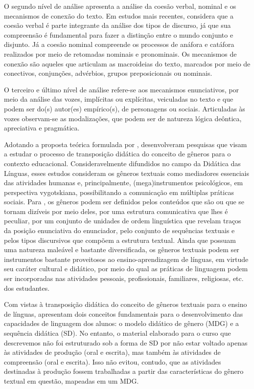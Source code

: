 O segundo nível de análise apresenta a análise da coesão verbal, nominal
e os mecanismos de conexão do texto. Em estudos mais recentes, \textcite{bronckart_teorias_2021} considera que a coesão verbal é parte integrante da análise dos
tipos de discurso, já que sua compreensão é fundamental para fazer a
distinção entre o mundo conjunto e disjunto. Já a coesão nominal
compreende os processos de anáfora e catáfora realizados por meio de
retomadas nominais e pronominais. Os mecanismos de conexão são aqueles
que articulam as macroideias do texto, marcados por meio de conectivos,
conjunções, advérbios, grupos preposicionais ou nominais.

O terceiro e último nível de análise refere-se aos mecanismos
enunciativos, por meio da análise das vozes, implícitas ou explícitas,
veiculadas no texto e que podem ser do(s) autor(es) empírico(s), de
personagens ou sociais. Articuladas às vozes observam-se as
modalizações, que podem ser de natureza lógica deôntica, apreciativa e
pragmática.

Adotando a proposta teórica formulada por \textcite{bronckart_notion_1999}, \textcite{dolz_pour_1998} desenvolveram pesquisas que visam a estudar o processo
de transposição didática do conceito de gêneros para o contexto
educacional. Consideravelmente difundidos no campo da Didática das
Línguas, esses estudos consideram os gêneros textuais como mediadores
essenciais das atividades humanas e, principalmente, (mega)instrumentos
psicológicos, em perspectiva vygotskiana, possibilitando a comunicação
em múltiplas práticas sociais. Para \textcite{schneuwly_generos_2004}, os gêneros
podem ser definidos pelos conteúdos que são ou que se tornam dizíveis
por meio deles, por uma estrutura comunicativa que lhes é peculiar, por
um conjunto de unidades de ordem linguística que revelam traços da
posição enunciativa do enunciador, pelo conjunto de sequências textuais
e pelos tipos discursivos que compõem a estrutura textual. Ainda que
possuam uma natureza maleável e bastante diversificada, os gêneros
textuais podem ser instrumentos bastante proveitosos ao
ensino-aprendizagem de línguas, em virtude seu caráter cultural e
didático, por meio do qual as práticas de linguagem podem ser
incorporadas nas atividades pessoais, profissionais, familiares,
religiosas, etc. dos estudantes.

Com vistas à transposição didática do conceito de gêneros textuais para
o ensino de línguas, \textcite{schneuwly_generos_2004} apresentam dois conceitos
fundamentais para o desenvolvimento das capacidades de linguagem dos
alunos: o modelo didático de gênero (MDG) e a sequência didática (SD).
No entanto, o material elaborado para o curso que descrevemos não foi
estruturado sob a forma de SD por não estar voltado apenas às atividades
de produção (oral e escrita), mas também às atividades de compreensão
(oral e escrita). Isso não evitou, contudo, que as atividades destinadas
à produção fossem trabalhadas a partir das características do gênero
textual em questão, mapeadas em um MDG.

